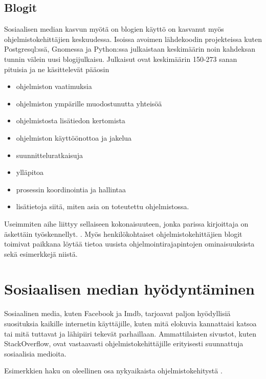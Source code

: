 \documentclass[finnish]{tktltiki2}
\theoremstyle{definition}
\theoremstyle{remark}
\begin{document}
\subsection{Blogit}
Sosiaalisen median kasvun myötä on blogien käyttö on kasvanut myös ohjelmistokehittäjien keskuudessa. Isoissa avoimen lähdekoodin projekteissa kuten Postgresql:ssä, Gnomessa ja Python:ssa julkaistaan keskimäärin noin kahdeksan tunnin välein uusi blogijulkaisu. Julkaisut ovat keskimäärin 150-273 sanan pituisia ja ne käsittelevät pääosin
\begin{itemize}
  \item ohjelmiston vaatimuksia
  \item ohjelmiston ympärille muodostunutta yhteisöä
  \item ohjelmistosta lisätiedon kertomista
  \item ohjelmiston käyttöönottoa ja jakelua
  \item suunnitteluratkaisuja
  \item ylläpitoa
  \item prosessin koordinointia ja hallintaa
  \item lisätietoja siitä, miten asia on toteutettu ohjelmistossa.
\end{itemize}

Useimmiten aihe liittyy sellaiseen kokonaisuuteen, jonka parissa kirjoittaja on äskettäin työskennellyt. \cite{how-dev-blog}.
Myös henkilökohtaiset ohjelmistokehittäjien blogit toimivat paikkana löytää tietoa uusista ohjelmointirajapintojen ominaisuuksista sekä esimerkkejä niistä.
\section{Sosiaalisen median hyödyntäminen}
Sosiaalinen media, kuten Facebook ja Imdb, tarjoavat paljon hyödyllisiä suosituksia kaikille internetin käyttäjille, kuten mitä elokuvia kannattaisi katsoa tai mitä tuttavat ja lähipiiri tekevät parhaillaan. Ammattilaisten sivustot, kuten StackOverflow, ovat vastaavasti ohjelmistokehittäjille erityisesti suunnattuja sosiaalisia medioita.

Esimerkkien haku on oleellinen osa nykyaikaista ohjelmistokehitystä \cite{example-overflow-social-media-for-code-recommendations}.
\end{document}
